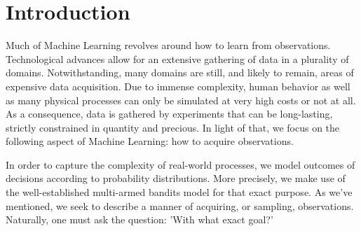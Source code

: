 \newcommand{\package}{\emph}

\chapter{Introduction}


Much of Machine Learning revolves around how to learn from observations.
Technological advances allow for an extensive gathering of data in a plurality
of domains. Notwithstanding, many domains are still, and likely to remain, areas
of expensive data acquisition. Due to immense complexity, human behavior as well
as many physical processes can only be simulated at very high costs or not at
all. As a consequence, data is gathered by experiments that can be long-lasting,
strictly constrained in quantity and precious. In light of that, we focus on the
following aspect of Machine Learning: how to acquire observations.

In order to capture the complexity of real-world processes, we model outcomes of
decisions according to probability distributions. More precisely, we make use of
the well-established multi-armed bandits model for that exact purpose. As we've
mentioned, we seek to describe a manner of acquiring, or sampling, observations.
Naturally, one must ask the question: 'With what exact goal?'


